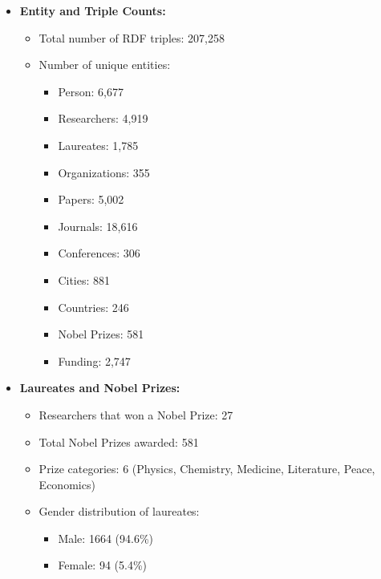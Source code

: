 \documentclass{article}
\begin{document}
\begin{itemize}
    \item \textbf{Entity and Triple Counts:}
    \begin{itemize}
        \item Total number of RDF triples: 207,258
        \item Number of unique entities:
        \begin{itemize}
            \item Person: 6,677
            \item Researchers: 4,919
            \item Laureates: 1,785
            \item Organizations: 355
            \item Papers: 5,002
            \item Journals: 18,616
            \item Conferences: 306
            \item Cities: 881
            \item Countries: 246
            \item Nobel Prizes: 581
            \item Funding: 2,747
        \end{itemize}
    \end{itemize}
    
    \item \textbf{Laureates and Nobel Prizes:}
    \begin{itemize}
        \item Researchers that won a Nobel Prize: 27
        \item Total Nobel Prizes awarded: 581
        \item Prize categories: 6 (Physics, Chemistry, Medicine, Literature, Peace, Economics)
        \item Gender distribution of laureates:
        \begin{itemize}
            \item Male: 1664 (94.6\%)
            \item Female: 94 (5.4\%)
        \end{itemize}
    \end{itemize}
    
\end{itemize}
\end{document}
